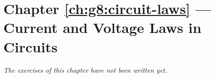 \section*{Chapter \ref{ch:g8:circuit-laws} --- Current and Voltage Laws in Circuits}


\emph{The exercises of this chapter have not been written yet.}
